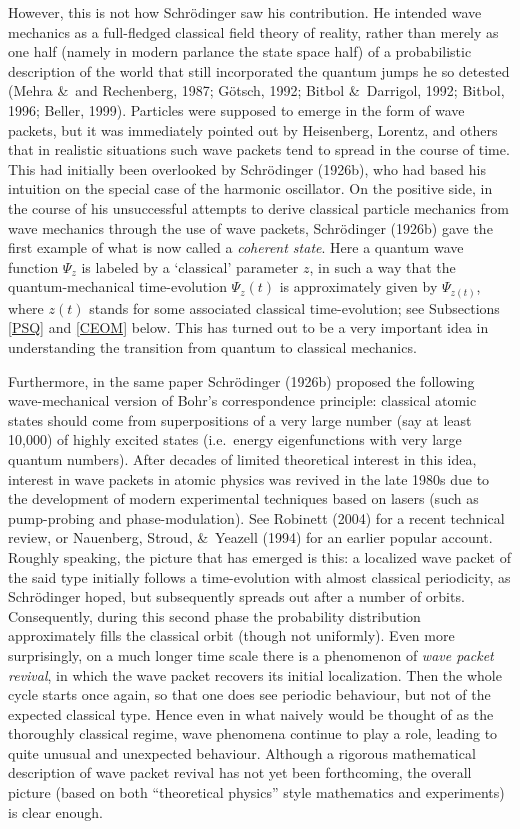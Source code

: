 \documentclass[12pt]{article}
\begin{document}
However, this is not how Schr\"{o}dinger saw his contribution. He intended wave mechanics as a full-fledged classical field theory of reality, rather than merely as one half (namely in modern parlance the state space half) of a probabilistic description of the world that still incorporated the quantum jumps he so detested (Mehra \&\ and Rechenberg,  1987; G\"{o}tsch, 1992; Bitbol \&\ Darrigol, 1992; Bitbol, 1996;  Beller, 1999). 
Particles were supposed to emerge in the form of wave packets, but it was immediately pointed out by Heisenberg, Lorentz,  and others that in realistic situations such wave packets tend to spread in the course of time. This had initially been overlooked by Schr\"{o}dinger (1926b), who had based his intuition on the special case of the harmonic oscillator. On the positive side, in the course of his unsuccessful attempts to derive classical particle mechanics from wave mechanics through the use of wave packets, Schr\"{o}dinger (1926b) gave the first example of what is now called a {\it coherent state}.
Here a quantum wave function $\Psi_z$ is labeled by a `classical' parameter $z$, in such a way that the quantum-mechanical time-evolution $\Psi_z(t)$ is approximately given by
$\Psi_{z(t)}$, where $z(t)$ stands for some associated classical time-evolution; see Subsections \ref{PSQ} and \ref{CEOM} below. This has turned out to be a very important idea in understanding the transition from quantum to classical mechanics. 

Furthermore, in the same paper Schr\"{o}dinger (1926b) proposed the following wave-mechanical version  of Bohr's correspondence principle: classical atomic states should come from superpositions of a very large number (say at least 10,000) of highly excited states (i.e.\ 
energy eigenfunctions with very large quantum numbers). After decades of limited theoretical interest in this idea, interest in wave packets in atomic physics was revived in the late 1980s  due to the development of modern experimental techniques based on lasers (such as pump-probing and phase-modulation). See  Robinett (2004) for a recent technical review, or  Nauenberg,  Stroud, \&\ Yeazell (1994) for an earlier popular account. Roughly speaking, the picture that has emerged is this: a localized wave packet of the said type initially follows a time-evolution with almost classical periodicity, as Schr\"{o}dinger hoped, but subsequently spreads out after a number of orbits. Consequently, during this second phase the probability distribution  approximately fills the classical orbit (though not uniformly). Even more surprisingly, on a much longer time scale there is a phenomenon of {\it wave packet revival}, in which the wave packet recovers its initial localization. Then the whole cycle starts once again, so that one does see periodic behaviour, but not of the expected classical type. Hence even in what naively would be thought of as the thoroughly  classical regime, wave phenomena continue to play a role,  leading to quite unusual and unexpected behaviour. Although a rigorous mathematical description of wave packet revival has not yet been forthcoming, the overall picture (based on both ``theoretical physics'' style mathematics and experiments) is clear enough.
\end{document}

